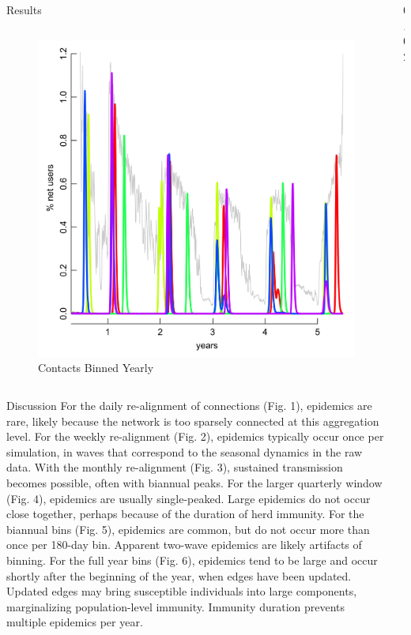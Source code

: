 \documentclass[final]{beamer} %
\newcommand{\spaceProp}{0.02}
\newcommand{\spacer}{\begin{column}{\spaceProp\paperwidth}\end{column}}
\newenvironment{oneCol}{\begin{column}[t]{0.225\paperwidth}}{\end{column}}
\newenvironment{threeCol}{\begin{column}[t]{0.715\paperwidth}}{\end{column}}
\begin{document}
\begin{frame}{}
\begin{columns}[t]
\begin{threeCol}
\begin{block}{Results}
\begin{columns}
\begin{oneCol}
\begin{figure}
      \end{figure}
      \setcounter{figure}{5}
      \begin{figure}
        \includegraphics[width=1.0\linewidth]{out365.png}
        \caption{Contacts Binned Yearly}
      \end{figure}  
    \end{oneCol}
    \end{columns}
    \end{block}
    \begin{block}{Discussion}
    For the daily re-alignment of connections (Fig. 1), epidemics are rare, likely because the network is too sparsely connected at this aggregation level.  For the weekly re-alignment (Fig. 2), epidemics typically occur once per simulation, in waves that correspond to the seasonal dynamics in the raw data.  With the monthly re-alignment (Fig. 3), sustained transmission becomes possible, often with biannual peaks.  For the larger quarterly window (Fig. 4), epidemics are usually single-peaked. Large epidemics do not occur close together, perhaps because of the duration of herd immunity.  For the biannual bins (Fig. 5), epidemics are common, but do not occur more than once per 180-day bin. Apparent two-wave epidemics are likely artifacts of binning.  For the full year bins (Fig. 6), epidemics tend to be large and occur shortly after the beginning of the year, when edges have been updated. Updated edges may bring susceptible individuals into large components, marginalizing population-level immunity. Immunity duration prevents multiple epidemics per year.
    \end{block}
    \end{threeCol}
    \spacer{}
    \end{columns}
  \end{frame}
  
\end{document}
